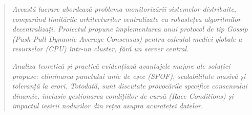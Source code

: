 \begin{abstract}
    \textit{Această lucrare abordează problema monitorizării sistemelor distribuite, comparând limitările arhitecturilor centralizate cu robustețea algoritmilor decentralizați. Proiectul propune implementarea unui protocol de tip \textit{Gossip} (Push-Pull Dynamic Average Consensus) pentru calculul mediei globale a resurselor (CPU) într-un cluster, fără un server central.}
    
    \textit{Analiza teoretică și practică evidențiază avantajele majore ale soluției propuse: eliminarea punctului unic de eșec (SPOF), scalabilitate masivă și toleranță la erori. Totodată, sunt discutate provocările specifice consensului dinamic, inclusiv gestionarea condițiilor de cursă (\textit{Race Conditions}) și impactul ieșirii nodurilor din rețea asupra acurateței datelor.}
\end{abstract}